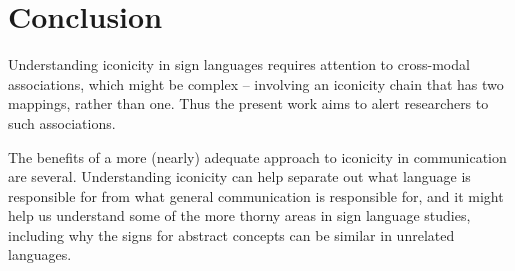 \documentclass[output=paper,
modfonts
]{LSP/langsci}
\begin{document}
\section{Conclusion }

Understanding iconicity in sign languages requires attention to
cross-modal associations, which might be complex -- involving an
iconicity chain that has two mappings, rather than one. Thus the present
work aims to alert researchers to such associations.

The benefits of a more (nearly) adequate approach to iconicity in
communication are several. Understanding iconicity can help separate out
what language is responsible for from what general communication is
responsible for, and it might help us understand some of the more thorny
areas in sign language studies, including why the signs for abstract
concepts can be similar in unrelated languages.
\end{document}
